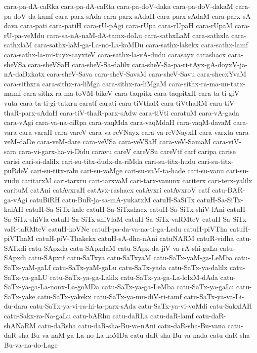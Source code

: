 {cara-pa-dA-caRka
cara-pa-dA-caRta
cara-pa-doV-daka
cara-pa-doV-dakaM
cara-pa-doV-da-kamf
cara-parx-sAda
cara-parx-sAdaH
cara-parx-sAdaM
cara-parx-sA-dava
cara-pati
cara-patiH
cara-rU-pAgi
cara-rUpa
cara-rUpaH
cara-rUpaM
cara-rU-pa-veMdu
cara-sa-nA-naM-dA-tamx-doLu
cara-sathxLaM
cara-sathxla
cara-sathxlaM
cara-sathx-laM-ga-La-no-La-koMDu
cara-sathx-lakekx
cara-sathx-lamf
cara-sathx-la-mi-tuyx-cayxteV
cara-sathx-la-vA-dudu
carasayx
carashacx
cara-sheVSa
cara-sheVSaH
cara-sheV-Sa-dalilx
cara-sheV-Sa-pa-ri-tAyx-gA-doyxV-ja-nA-daBxkatx
cara-sheV-Sava
cara-sheV-SavaM
cara-sheV-Savu
cara-shecxYvaM
cara-sithxra
cara-sithx-ra-liMga
cara-sithx-ra-liMgaM
cara-sithx-ra-ma-nu-tatx-mamf
cara-sithx-ra-ma-toVM-bikeV
cara-taqpitx
cara-taqpitxH
cara-ta-ti-giV-vuta
cara-ta-ti-gi-tatxru
caratf
carati
cara-tiVthaR
cara-tiVthaRM
cara-tiV-thaR-parx-sAdaH
cara-tiV-thaR-parx-sAdw
cara-tiVti
caratuM
cara-vA-gada
cara-vAgi
cara-va-na-ciRpa
cara-vaqMda
cara-vaqMdaH
cara-vaqM-davaM
cara-vara
cara-varaH
cara-vareV
cara-va-reVNayx
cara-va-reVNayxH
cara-varxta
cara-veM-daDe
cara-veM-dare
cara-veVSa
cara-veVSaH
cara-veV-SamaM
cara-viV-sara
cara-vi-garx-ha-vi-Didu
caravu
careV
careVSu
careVtf
carf
caripa
carise
carisi
cari-si-dalilx
cari-su-titx-dudx-da-riMda
cari-su-titx-hudu
cari-su-titx-puRdeV
cari-su-titx-ralu
cari-su-vaMge
cari-su-vaM-ta-hade
cari-su-vanu
cari-su-vudu
caritarxM
cari-tarxru
cari-tarxvaM
cari-tarx-vanunx
cariterx
cari-terx-yalilx
carituM
catAni
catAvxraH
catAvx-rashacx
catAvxri
catAvxroV
catf
catu-BAR-ga-vAgi
catuBiRH
catu-BuR-ja-sa-mA-yukatxM
catuH-SaSiTx
catuH-Sa-SiTx-kalAH
catuH-Sa-SiTx-kale
catuH-Sa-SiTxshacx
catuH-Sa-SiTx-shiV-lAni
catuH-Sa-SiTx-shiVla
catuH-Sa-SiTx-shiVlaM
catuH-Sa-SiTx-vaRMteV
catuH-Sa-SiTx-vaR-taRMteV
catuH-koVNe
catuH-pa-da-va-na-ti-ga-Ledu
catuH-piVTha
catuH-piVThaM
catuH-piV-Thakekx
catuH-sA-dha-nAni
catuNARM
catuR-vidha
catu-SATxdi
catu-SApxda
catu-SApxdaM
catu-SApx-da-jiV-va-rA-shi-gaLa
catu-SApxdi
catu-SApxtf
catu-SaTxya
catu-SaTxyaM
catu-SaTx-yaM-ga-LeMba
catu-SaTx-yaM-gaLf
catu-SaTx-yaM-gaLu
catu-SaTx-yada
catu-SaTx-ya-dalilx
catu-SaTx-ya-gaLU
catu-SaTx-ya-ga-Lalilx
catu-SaTx-ya-ga-La-lolxM-dAda
catu-SaTx-ya-ga-La-nonx-La-goMDa
catu-SaTx-ya-ga-LeMba
catu-SaTx-ya-gaLu
catu-SaTx-yake
catu-SaTx-yakekx
catu-SaTx-ya-mu-diV-ri-tamf
catu-SaTx-ya-va-Li-du-dara
catu-SaTx-ya-vi-ra-hi-ta-parx-sAda
catu-SaTx-ya-vi-voMdi
catu-SakxlAH
catu-Sakx-ra-Na-gaLu
catu-bARhu
catu-daRLa
catu-daR-lamf
catu-daR-shANaRM
catu-daRsha
catu-daR-sha-Bu-va-nAni
catu-daR-sha-Bu-vana
catu-daR-sha-Bu-va-naM-ga-La-no-La-koMDa
catu-daR-sha-Bu-va-nada
catu-daR-sha-Bu-va-na-do-Lage
}
